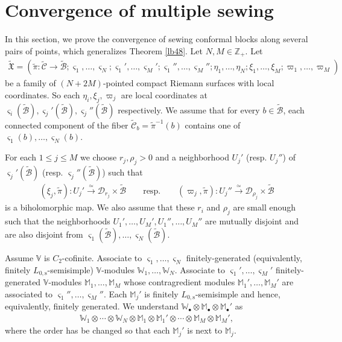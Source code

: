 \documentclass[12pt,a4paper,notitlepage]{article}
\theoremstyle{definition}
\theoremstyle{plain}
\newcommand{\fk}{\mathfrak}
\newcommand{\mc}{\mathcal}
\newcommand{\wtd}{\widetilde}
\newcommand{\sgm}{\varsigma}
\newcommand{\blt}{\bullet}
\newcommand{\Vbb}{\mathbb V}
\newcommand{\Wbb}{\mathbb W}
\newcommand{\Mbb}{\mathbb M}
\newcommand{\Zbb}{\mathbb Z}
\newcommand{\Lss}{{L_{0,\mathrm{s}}}}
\numberwithin{equation}{section}
\begin{document}
\section{Convergence of multiple sewing}\label{lb56}


In this section, we prove the convergence of sewing conformal blocks along several pairs of points, which generalizes Theorem \ref{lb48}. Let $N,M\in\Zbb_+$. Let
\begin{align*}
\wtd{\fk X}=(\wtd\pi:\wtd{\mc C}\rightarrow\wtd{\mc B};\sgm_1,\dots,\sgm_N;\sgm_1',\dots,\sgm_M';\sgm_1'',\dots,\sgm_M'';\eta_1,\dots,\eta_N;\xi_1,\dots,\xi_M;\varpi_1,\dots,\varpi_M)
\end{align*}
be a family of $(N+2M)$-pointed compact Riemann surfaces with local coordinates. So each $\eta_i,\xi_j,\varpi_j$ are local coordinates at $\sgm_i(\wtd{\mc B}),\sgm_j'(\wtd{\mc B}),\sgm_j''(\wtd{\mc B})$ respectively. We assume that for every $b\in\wtd{\mc B}$, each connected component of the fiber  $\wtd{\mc C}_b=\wtd\pi^{-1}(b)$ contains one of $\sgm_1(b),\dots,\sgm_N(b)$.

For each $1\leq j\leq M$ we choose $r_j,\rho_j>0$ and a neighborhood $U_j'$ (resp. $U_j''$) of $\sgm_j'(\wtd {\mc B})$ (resp. $\sgm_j''(\wtd {\mc B})$) such that
\begin{gather}
(\xi_j,\wtd\pi):U_j'\xrightarrow{\simeq} \mc D_{r_j}\times\wtd{\mc B}\qquad\text{resp.}\qquad (\varpi_j,\wtd\pi):U_j''\xrightarrow{\simeq} \mc D_{\rho_j}\times\wtd{\mc B}\label{eq94}
\end{gather}
is a biholomorphic map. We also assume that these $r_i$ and $\rho_j$ are small enough such that the neighborhoods $U_1',\dots,U_M',U_1'',\dots,U_M''$ are mutually disjoint and are also disjoint from $\sgm_1(\wtd{\mc B}),\dots,\sgm_N(\wtd{\mc B})$. 




Assume $\Vbb$ is $C_2$-cofinite. Associate to $\sgm_1,\dots,\sgm_N$ finitely-generated (equivalently, finitely $\Lss$-semisimple) $\Vbb$-modules $\Wbb_1,\dots,\Wbb_N$. Associate to $\sgm_1',\dots,\sgm_M'$ finitely-generated  $\Vbb$-modules $\Mbb_1,\dots,\Mbb_M$ whose contragredient modules $\Mbb_1',\dots,\Mbb_M'$ are associated to $\sgm_1'',\dots,\sgm_M''$. Each $\Mbb_j'$ is finitely $\Lss$-semisimple and hence, equivalently, finitely generated.  We understand $\Wbb_\blt\otimes\Mbb_\blt\otimes\Mbb_\blt'$ as
\begin{align*}
\Wbb_1\otimes\cdots\otimes \Wbb_N\otimes\Mbb_1\otimes\Mbb_1'\otimes\cdots\otimes\Mbb_M\otimes\Mbb_M',
\end{align*}
where the order has be changed so that each $\Mbb_j'$ is next to $\Mbb_j$. 
\end{document}
